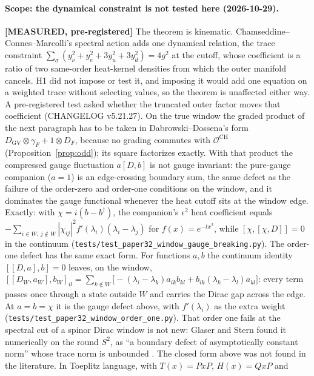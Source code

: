 \documentclass[11pt]{article}
\begin{document}
\paragraph{Scope: the dynamical constraint is not tested here (2026-10-29).}
\textbf{[MEASURED, pre-registered]} The theorem is kinematic.
Chamseddine--Connes--Marcolli's spectral action adds one dynamical
relation, the trace constraint $\sum_\sigma (y_\nu^2 + y_e^2 + 3y_u^2 +
3y_d^2) = 4g^2$ at the cutoff, whose coefficient is a ratio of two
same-order heat-kernel densities from which the outer manifold cancels.
H1 did not impose or test it, and imposing it would add one equation on
a weighted trace without selecting values, so the theorem is unaffected
either way. A pre-registered test asked whether the truncated outer
factor moves that coefficient (CHANGELOG v5.21.27). On the true window
the graded product of the next paragraph has to be taken in
Dabrowski--Dossena's form $D_{\mathrm{GV}} \otimes \gamma_F + 1 \otimes
D_F$, because no grading commutes with $\mathcal{O}^{\mathrm{CH}}$
(Proposition~\ref{prop:odd}); its square factorizes exactly. With that
product the compressed gauge fluctuation $a[D,b]$ is not gauge
invariant: the pure-gauge companion ($a = 1$) is an edge-crossing
boundary sum, the same defect as the failure of the order-zero and
order-one conditions on the window, and it dominates the gauge
functional whenever the heat cutoff sits at the window edge. Exactly:
with $\chi = i(b - b^\dagger)$, the companion's $\epsilon^2$ heat
coefficient equals $-\sum_{i\in W,\,j\notin W} |\chi_{ij}|^2
f'(\lambda_i)(\lambda_i - \lambda_j)$ for $f(x) = e^{-tx^2}$, while
$[\chi,[\chi,D]] = 0$ in the continuum
(\texttt{tests/test\_paper32\_window\_gauge\_breaking.py}). The
order-one defect has the same exact form. For functions $a, b$ the
continuum identity $[[D,a],b] = 0$ leaves, on the window,
$[[D_W,a_W],b_W]_{il} = \sum_{k\notin W} \bigl[-(\lambda_i-\lambda_k)
a_{ik}b_{kl} + b_{ik}(\lambda_k-\lambda_l)a_{kl}\bigr]$: every term
passes once through a state outside $W$ and carries the Dirac gap
across the edge. At $a = b = \chi$ it is the gauge defect above, with
$f'(\lambda_i)$ as the extra weight
(\texttt{tests/test\_paper32\_window\_order\_one.py}).  That order one
fails at the spectral cut of a spinor Dirac window is not new: Glaser
and Stern found it numerically on the round $S^2$, as ``a boundary
defect of asymptotically constant norm'' whose trace norm is unbounded
\cite{glaser_stern2020}.  The closed form above was not found in the
literature.  In Toeplitz language, with $T(x) = PxP$, $H(x) = QxP$ and
\end{document}
